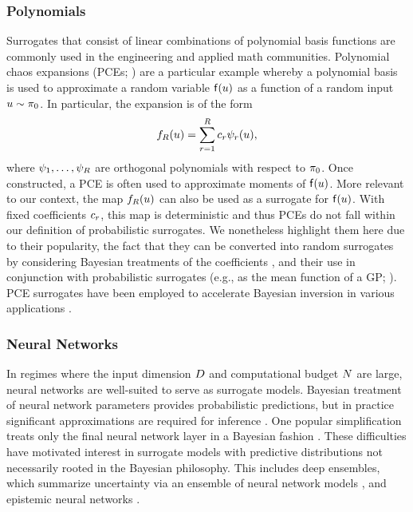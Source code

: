 \documentclass[12pt]{article}
\begin{document}
\subsubsection{Polynomials}
Surrogates that consist of linear combinations of polynomial basis functions are 
commonly used in the engineering and applied math communities. 
Polynomial chaos expansions (PCEs; \citet[Chapter 9]{UQpredCompSci}) are a particular example whereby 
a polynomial basis is used to approximate a random variable $\target(\Par)$ as a function of
a random input $\Par \sim \priorDens$. In particular, the expansion is of the form
\begin{equation}
\targetEm[\dimBasis](\Par) = \sum_{\idxBasis=1}^{\dimBasis} c_{\idxBasis} \basisVec_{\idxBasis}(\Par),
\end{equation}
where $\basisVec_{1}, \dots, \basisVec_{\dimBasis}$ are orthogonal polynomials with respect 
to $\priorDens$. Once constructed, a PCE is often used to 
approximate moments of $\target(\Par)$. More relevant to our context,
the map $\targetEm[\dimBasis](\Par)$ can also be used as a surrogate for $\target(\Par)$.
With fixed coefficients $c_{\idxBasis}$, this map is deterministic and thus PCEs do not fall
within our definition of probabilistic surrogates. We nonetheless highlight them here
due to their popularity, the fact that they can be converted into random surrogates by 
considering Bayesian treatments of the coefficients 
\citep{BayesianPCE1,BayesianPCE2,BurknerSurrogate},
and their use in conjunction with probabilistic surrogates (e.g., as the mean function
of a GP; \citet{PCEGPWind,PCEGP2,SinsbeckNowak}). PCE surrogates have been
employed to accelerate Bayesian inversion in various applications 
\citep{dimRedPolyChaos,BurknerSurrogate,PCEBIP}.

\subsubsection{Neural Networks}
In regimes where the input dimension $\dimPar$ and computational 
budget $\Ndesign$ are large, neural networks are well-suited to 
serve as surrogate models. Bayesian treatment of neural 
network parameters provides probabilistic predictions, but in practice significant 
approximations are required for inference \citep{BayesOptNN}. One popular simplification
treats only the final neural network layer in a Bayesian fashion 
\citep{BayesLastLayer,BayesOptBayesLastLayer}. These difficulties have motivated
interest in surrogate models with predictive distributions 
not necessarily rooted in the Bayesian philosophy. This includes deep ensembles, 
which summarize uncertainty via an ensemble of neural network 
models \citep{deepEnsembles,Lueckmann2018LikelihoodfreeIW},
and epistemic neural networks \citep{epistemicNN,BayesOptEpistemicNN}.
\end{document}
